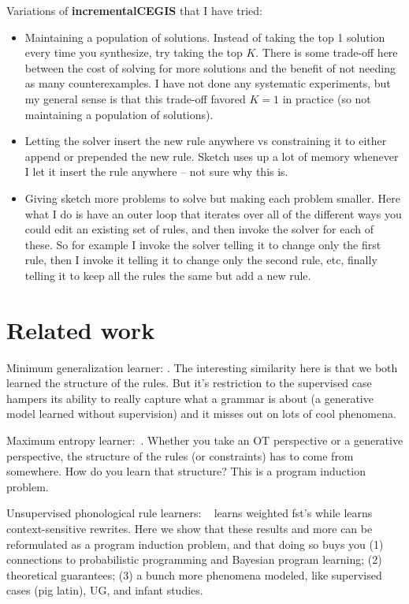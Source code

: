 \documentclass{article}
\begin{document}
Variations of \textbf{incrementalCEGIS} that I have tried:
\begin{itemize}
\item[] Maintaining a population of solutions. Instead of taking the top 1 solution every time you synthesize, try taking the top $K$. There is some trade-off here between the cost of solving for more solutions and
  the benefit of not needing as many counterexamples. I have not done any systematic experiments,
  but my general sense is that this trade-off favored $K = 1$ in practice (so not maintaining a population of solutions).
\item[] Letting the solver insert the new rule anywhere vs constraining it to either append or prepended the new rule. Sketch uses up a lot of memory whenever I let it insert the rule anywhere -- not sure why this is.
\item[] Giving sketch more problems to solve but making each problem smaller. Here what I do is have an outer loop that iterates over all of the different ways you could edit an existing set of rules, and then invoke the solver for each of these. So for example I invoke the solver telling it to change only the first rule,
  then I invoke it telling it to change only the second rule, etc, finally telling it to keep all the rules the same but add a new rule.
\end{itemize}



\section{Related work}

Minimum generalization learner: \cite{Albright03rulesvs}. The interesting similarity here is that we both learned the structure of the rules. But it's restriction to the supervised case hampers its ability to really capture what a grammar is about (a generative model learned without supervision) and it misses out on lots of cool phenomena.

Maximum entropy learner:~\cite{goldwater2003learning}. Whether you take an OT perspective or a generative perspective, the structure of the rules (or constraints) has to come from somewhere. How do you learn that structure? This is a program induction problem.

Unsupervised phonological rule learners:
~\cite{cotterell-peng-eisner-2015} learns weighted fst's while
\cite{rulebased} learns context-sensitive rewrites. Here we show that
these results and more can be reformulated as a program induction
problem, and that doing so buys you (1) connections to probabilistic
programming and Bayesian program learning; (2) theoretical guarantees;
(3) a bunch more phenomena modeled, like supervised cases (pig latin),
UG, and infant studies.
\end{document}
